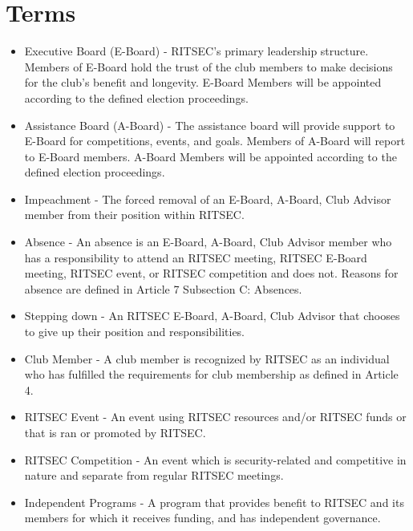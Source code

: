 \documentclass{article}
\begin{document}

\part{Terms}

\begin{itemize}
  \item Executive Board (E-Board) - RITSEC’s primary leadership structure.
    Members of E-Board hold the trust of the club members to make decisions for
    the club's benefit and longevity. E-Board Members will be appointed
    according to the defined election proceedings.
  \item Assistance Board (A-Board) - The assistance board will provide support
    to E-Board for competitions, events, and goals. Members of A-Board will
    report to E-Board members. A-Board Members will be appointed according to
    the defined election proceedings.
  \item Impeachment - The forced removal of an E-Board, A-Board, Club Advisor
    member from their position within RITSEC.
  \item Absence - An absence is an E-Board, A-Board, Club Advisor member who
    has a responsibility to attend an RITSEC meeting, RITSEC E-Board meeting,
    RITSEC event, or RITSEC competition and does not. Reasons for absence are
    defined in Article 7 Subsection C: Absences.
  \item Stepping down - An RITSEC E-Board, A-Board, Club Advisor that chooses
    to give up their position and responsibilities.
  \item Club Member - A club member is recognized by RITSEC as an individual
    who has fulfilled the requirements for club membership as defined in
    Article 4.
  \item RITSEC Event - An event using RITSEC resources and/or RITSEC funds or
    that is ran or promoted by RITSEC.
  \item RITSEC Competition - An event which is security-related and competitive
    in nature and separate from regular RITSEC meetings.
  \item Independent Programs - A program that provides benefit to RITSEC and
    its members for which it receives funding, and has independent governance.
\end{itemize}
\end{document}
